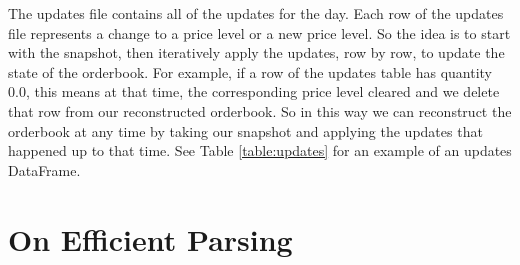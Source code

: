 \documentclass[a4paper, oneside, notitlepage]{book}
\begin{document}
The updates file contains all of the updates for the day.
Each row of the updates file represents a change to a price level or a new price level.
So the idea is to start with the snapshot, then iteratively apply the updates, row by row,
to update the state of the orderbook. For example, if a row of the updates table has quantity 0.0,
this means at that time, the corresponding price level cleared and we delete that row
from our reconstructed orderbook. So in this way we can reconstruct the orderbook at any time
by taking our snapshot and applying the updates that happened up to that time.
See Table \ref{table:updates} for an example of an updates DataFrame.



\begin{table}[ht]
    \centering
    \caption{Example updates data for BTCUSDT.}
    \label{table:updates}
\end{table}


\section{On Efficient Parsing}
\end{document}
